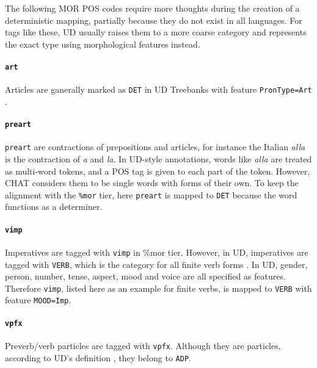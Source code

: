 The following MOR POS codes require more thoughts during the creation of a deterministic mapping, partially because they do not exist in all languages. For tags like these, UD usually raises them to a more coarse category and represents the exact type using morphological features instead.

\paragraph{\texttt{art}}
Articles are ganerally marked as \texttt{DET} in UD Treebanks with feature \texttt{PronType=Art} .

\paragraph{\texttt{preart}}
\texttt{preart} are contractions of prepositions and articles, for instance the Italian \emph{alla} is the contraction of \emph{a} and \emph{la}. In UD-style annotations, words like \emph{alla} are treated as multi-word tokens, and a POS tag is given to each part of the token. However, CHAT considers them to be single words with forms of their own. To keep the alignment with the \texttt{\%mor} tier, here \texttt{preart} is mapped to \texttt{DET} because the word functions as a determiner.

\paragraph{\texttt{vimp}}
Imperatives are tagged with \texttt{vimp} in \%mor tier. However, in UD, imperatives are tagged with \texttt{VERB}, which is the category for all finite verb forms  . In UD, gender, person, number, tense, aspect, mood and voice are all specified as features. Therefore \texttt{vimp}, listed here as an example for finite verbs, is mapped to \texttt{VERB} with feature \texttt{MOOD=Imp}.

\paragraph{\texttt{vpfx}}
Preverb/verb particles are tagged with \texttt{vpfx}. Although they are particles, according to UD's definition , they belong to \texttt{ADP}.

